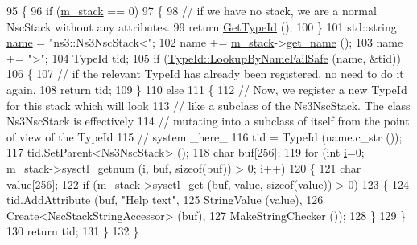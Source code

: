 \begin{DoxyCode}
95 \{
96   \textcolor{keywordflow}{if} (\hyperlink{classns3_1_1Ns3NscStack_a2de1abd9c5f7bca7321570353649ef93}{m\_stack} == 0)
97     \{
98       \textcolor{comment}{// if we have no stack, we are a normal NscStack without any attributes.}
99       \textcolor{keywordflow}{return} \hyperlink{classns3_1_1Ns3NscStack_af7d0429052e042008d96c5b3fca3193d}{GetTypeId} ();
100     \}
101   std::string \hyperlink{generate__test__data__lte__spectrum__model_8m_ab74e6bf80237ddc4109968cedc58c151}{name} = \textcolor{stringliteral}{"ns3::Ns3NscStack<"};
102   name += \hyperlink{classns3_1_1Ns3NscStack_a2de1abd9c5f7bca7321570353649ef93}{m\_stack}->\hyperlink{structINetStack_a665ce57b538c87f2ba7b0f03ca5f89be}{get\_name} ();
103   name += \textcolor{stringliteral}{">"};
104   TypeId tid;
105   \textcolor{keywordflow}{if} (\hyperlink{classns3_1_1TypeId_acceab1f57bfe3c3af02130277d409f14}{TypeId::LookupByNameFailSafe} (name, &tid))
106     \{
107       \textcolor{comment}{// if the relevant TypeId has already been registered, no need to do it again.}
108       \textcolor{keywordflow}{return} tid;
109     \}
110   \textcolor{keywordflow}{else}
111     \{
112       \textcolor{comment}{// Now, we register a new TypeId for this stack which will look}
113       \textcolor{comment}{// like a subclass of the Ns3NscStack. The class Ns3NscStack is effectively}
114       \textcolor{comment}{// mutating into a subclass of itself from the point of view of the TypeId}
115       \textcolor{comment}{// system \_here\_}
116       tid = TypeId (name.c\_str ());
117       tid.SetParent<Ns3NscStack> ();
118       \textcolor{keywordtype}{char} buf[256];
119       \textcolor{keywordflow}{for} (\textcolor{keywordtype}{int} \hyperlink{bernuolliDistribution_8m_a6f6ccfcf58b31cb6412107d9d5281426}{i}=0; \hyperlink{classns3_1_1Ns3NscStack_a2de1abd9c5f7bca7321570353649ef93}{m\_stack}->\hyperlink{structINetStack_a102073dbedc3c2f290658795ede66aa0}{sysctl\_getnum} (\hyperlink{bernuolliDistribution_8m_a6f6ccfcf58b31cb6412107d9d5281426}{i}, buf, \textcolor{keyword}{sizeof}(buf)) > 0; 
      \hyperlink{bernuolliDistribution_8m_a6f6ccfcf58b31cb6412107d9d5281426}{i}++)
120         \{
121           \textcolor{keywordtype}{char} value[256];
122           \textcolor{keywordflow}{if} (\hyperlink{classns3_1_1Ns3NscStack_a2de1abd9c5f7bca7321570353649ef93}{m\_stack}->\hyperlink{structINetStack_a396b535a199299a904f52e00d0dbf590}{sysctl\_get} (buf, value, \textcolor{keyword}{sizeof}(value)) > 0)
123             \{
124               tid.AddAttribute (buf, \textcolor{stringliteral}{"Help text"},
125                                 StringValue (value),
126                                 Create<NscStackStringAccessor> (buf),
127                                 MakeStringChecker ());
128             \}
129         \}
130       \textcolor{keywordflow}{return} tid;
131     \}
132 \}
\end{DoxyCode}


